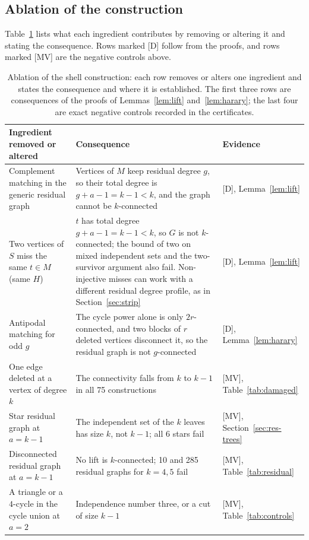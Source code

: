 \subsection{Ablation of the construction}\label{sec:res-ablation}

Table~\ref{tab:ablation} lists what each ingredient contributes by removing or altering it and stating the consequence.
Rows marked [D] follow from the proofs, and rows marked [MV] are the negative controls above.

\begin{table}[ht]
\centering\small
\begin{tabular}{p{}p{}p{}}
\toprule
Ingredient removed or altered & Consequence & Evidence\\
\midrule
Complement matching in the generic residual graph & Vertices of $M$ keep residual degree $g$, so their total degree is $g+a-1=k-1<k$, and the graph cannot be $k$-connected & [D], Lemma~\ref{lem:lift}\\
Two vertices of $S$ miss the same $t\in M$ (same $H$) & $t$ has total degree $g+a-1=k-1<k$, so $G$ is not $k$-connected; the bound of two on mixed independent sets and the two-survivor argument also fail. Non-injective misses can work with a different residual degree profile, as in Section~\ref{sec:strip} & [D], Lemma~\ref{lem:lift}\\
Antipodal matching for odd $g$ & The cycle power alone is only $2r$-connected, and two blocks of $r$ deleted vertices disconnect it, so the residual graph is not $g$-connected & [D], Lemma~\ref{lem:harary}\\
One edge deleted at a vertex of degree $k$ & The connectivity falls from $k$ to $k-1$ in all 75 constructions & [MV], Table~\ref{tab:damaged}\\
Star residual graph at $a=k-1$ & The independent set of the $k$ leaves has size $k$, not $k-1$; all 6 stars fail & [MV], Section~\ref{sec:res-trees}\\
Disconnected residual graph at $a=k-1$ & No lift is $k$-connected; 10 and 285 residual graphs for $k=4,5$ fail & [MV], Table~\ref{tab:residual}\\
A triangle or a $4$-cycle in the cycle union at $a=2$ & Independence number three, or a cut of size $k-1$ & [MV], Table~\ref{tab:controls}\\
\bottomrule
\end{tabular}
\caption{Ablation of the shell construction: each row removes or alters one ingredient and states the consequence and where it is established. The first three rows are consequences of the proofs of Lemmas~\ref{lem:lift} and~\ref{lem:harary}; the last four are exact negative controls recorded in the certificates.}
\label{tab:ablation}
\end{table}

